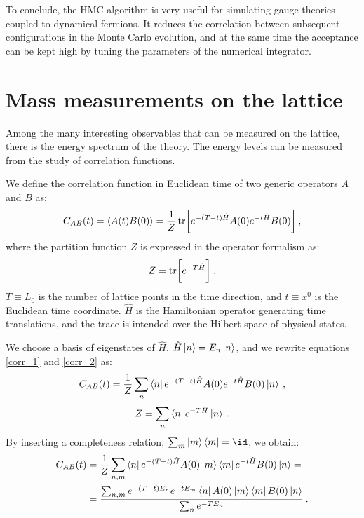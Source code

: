 To conclude, the HMC algorithm is very useful for simulating gauge theories coupled to dynamical fermions. It reduces the correlation between subsequent configurations in the Monte Carlo evolution, and at the same time the acceptance can be kept high by tuning the parameters of the numerical integrator.



\section{Mass measurements on the lattice}
\label{mass_measurements}

Among the many interesting observables that can be measured on the lattice, there is the energy spectrum of the theory. The energy levels can be measured from the study of correlation functions. 

We define the correlation function in Euclidean time of two generic operators $A$ and $B$ as:
\begin{equation}
C_{AB}(t) = \langle A(t) B(0) \rangle = \frac{1}{Z} \tr \biggl[ e^{-(T-t)\hat H} A(0) e^{-t \hat H} B(0) \biggr] \: ,
\label{corr_1}
\end{equation}
%
where the partition function $Z$ is expressed in the operator formalism as: 
\begin{equation}
Z = \tr \biggl[ e^{-T \hat H} \biggr] \: .
\label{corr_2}
\end{equation}
%
$T \equiv L_0$ is the number of lattice points in the time direction, and $t \equiv x^0$ is the Euclidean time coordinate. $\hat H$ is the Hamiltonian operator generating time translations, and the trace is intended over the Hilbert space of physical states.

We choose a basis of eigenstates of $\hat H$, $\hat H \ket{n} = E_n \ket{n}$, and we rewrite equations \ref{corr_1} and \ref{corr_2} as:
\begin{equation}
C_{AB}(t) = \frac{1}{Z} \sum_n \bra{n} e^{-(T-t)\hat H} A(0) e^{-t \hat H} B(0) \ket{n}\: ,
\end{equation}
\begin{equation}
Z = \sum_n \bra{n} e^{-T \hat H} \ket{n} \: .
\end{equation}
%
By inserting a completeness relation, $\sum_m \ket{m} \bra{m} = \id$, we obtain:
\begin{equation}
\begin{split}
C_{AB}(t) & = \frac{1}{Z} \sum_{n,m} \bra{n} e^{-(T-t)\hat H} A(0)\ket{m} \bra{m} e^{-t \hat H} B(0) \ket{n} = \\
& = \frac{\sum _{n,m}e^{-(T-t)E_n} e^{-tE_m}\bra{n} A(0) \ket{m} \bra{m} B(0) \ket{n}}{\sum_n e^{-TE_n}} \: .
\end{split}
\end{equation}



